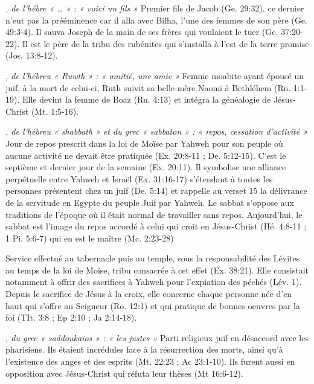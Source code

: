 \begin{multicols}{2}
\textit{, de l’hébre « … » : « voici un fils »}\newline
Premier fils de Jacob (Ge. 29:32), ce dernier n'eut pas la prééminence car il alla avec Bilha, l'une des femmes de son père (Ge. 49:3-4). Il sauva Joseph de la main de ses frères qui voulaient le tuer (Ge. 37:20-22). Il est le père de la tribu des rubénites qui s'installa à l'est de la terre promise (Jos. 13:8-12).

\textit{, de l'hébreu « Ruwth » : « amitié, une amie »}\newline
Femme moabite ayant épousé un juif, à la mort de celui-ci, Ruth suivit sa belle-mère Naomi à Bethléhem (Ru. 1:1-19). Elle devint la femme de Boaz (Ru. 4:13) et intégra la généalogie de Jésus-Christ (Mt. 1:5-16).

\textit{, de l'hébreu « shabbath » et du grec « sabbaton » : « repos, cessation d'activité »}\newline
Jour de repos prescrit dans la loi de Moïse par Yahweh pour son peuple où aucune activité ne devait être pratiquée (Ex. 20:8-11 ; De. 5:12-15). C'est le septième et dernier jour de la semaine (Ex. 20:11). Il symbolise une alliance perpétuelle entre Yahweh et Israël (Ex. 31:16-17) s'étendant à toutes les personnes présentent chez un juif (De. 5:14) et rappelle au verset 15 la délivrance de la servitude en Egypte du peuple Juif par Yahweh. Le sabbat s'oppose aux traditions de l'époque où il était normal de travailler sans repos. Aujourd'hui, le sabbat est l'image du repos accordé à celui qui croit en Jésus-Christ (Hé. 4:8-11 ; 1 Pi. 5:6-7) qui en est le maître (Mc. 2:23-28)

\textit{}\newline
Service effectué au tabernacle puis au temple, sous la responsabilité des Lévites au temps de la loi de Moïse, tribu consacrée à cet effet (Ex. 38:21). Elle consistait notamment à offrir des sacrifices à Yahweh pour l'expiation des péchés (Lév. 1). Depuis le sacrifice de Jésus à la croix, elle concerne chaque personne née d'en haut qui s'offre au Seigneur (Ro. 12:1) et qui pratique de bonnes oeuvres par la foi (TIt. 3:8 ; Ep 2:10 ; Ja 2:14-18).

\textit{, du grec « saddoukaios » : « les justes »}\newline
Parti religieux juif en désaccord avec les pharisiens. Ils étaient incrédules face à la résurrection des morts, ainsi qu'à l'existence des anges et des esprits (Mt. 22:23 ; Ac 23:1-10). Ils furent aussi en opposition avec Jésus-Christ qui réfuta leur thèses (Mt 16:6-12).


\end{multicols}
